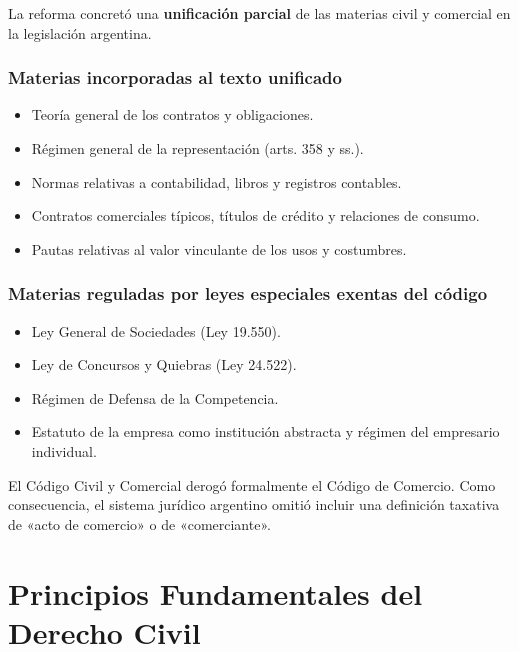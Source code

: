 \documentclass[12pt,oneside]{book}
\begin{document}
La reforma concretó una \textbf{unificación parcial} de las materias civil y comercial en la legislación argentina.

\subsection{Materias incorporadas al texto unificado}
\begin{itemize}
    \item Teoría general de los contratos y obligaciones.
    \item Régimen general de la representación (arts. 358 y ss.).
    \item Normas relativas a contabilidad, libros y registros contables.
    \item Contratos comerciales típicos, títulos de crédito y relaciones de consumo.
    \item Pautas relativas al valor vinculante de los usos y costumbres.
\end{itemize}

\subsection{Materias reguladas por leyes especiales exentas del código}
\begin{itemize}
    \item Ley General de Sociedades (Ley 19.550).
    \item Ley de Concursos y Quiebras (Ley 24.522).
    \item Régimen de Defensa de la Competencia.
    \item Estatuto de la empresa como institución abstracta y régimen del empresario individual.
\end{itemize}

\begin{note}
El Código Civil y Comercial derogó formalmente el Código de Comercio. Como consecuencia, el sistema jurídico argentino omitió incluir una definición taxativa de «acto de comercio» o de «comerciante».
\end{note}


\chapter{Principios Fundamentales del Derecho Civil}
\end{document}
